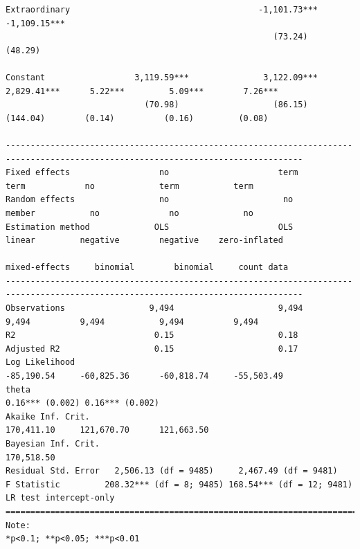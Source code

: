 \documentclass[letter,12pt]{article}
\begin{document}
\begin{table}
\begin{tiny}
\begin{verbatim}
Extraordinary                                      -1,101.73***        -1,109.15***                                               
                                                      (73.24)             (48.29)                                                 
                                                                                                                                  
Constant                  3,119.59***               3,122.09***         2,829.41***      5.22***         5.09***        7.26***   
                            (70.98)                   (86.15)            (144.04)        (0.14)          (0.16)         (0.08)    
                                                                                                                                  
----------------------------------------------------------------------------------------------------------------------------------
Fixed effects                  no                      term                term            no             term           term
Random effects                 no                       no                member           no              no             no
Estimation method             OLS                      OLS                linear         negative        negative    zero-inflated
                                                                       mixed-effects     binomial        binomial     count data   
----------------------------------------------------------------------------------------------------------------------------------
Observations                 9,494                     9,494               9,494          9,494           9,494          9,494    
R2                            0.15                     0.18                                                                       
Adjusted R2                   0.15                     0.17                                                                       
Log Likelihood                                                          -85,190.54     -60,825.36      -60,818.74     -55,503.49  
theta                                                                                0.16*** (0.002) 0.16*** (0.002)              
Akaike Inf. Crit.                                                       170,411.10     121,670.70      121,663.50                 
Bayesian Inf. Crit.                                                     170,518.50                                                
Residual Std. Error   2,506.13 (df = 9485)     2,467.49 (df = 9481)                                                               
F Statistic         208.32*** (df = 8; 9485) 168.54*** (df = 12; 9481)
LR test intercept-only      
==================================================================================================================================
Note:                                                                                                  *p<0.1; **p<0.05; ***p<0.01
\end{verbatim}
  \end{tiny}
  \caption{Models of legislative debate. Standard errors in parentheses. } 
  \label{T:regs} 
\end{table} 
\end{document}
